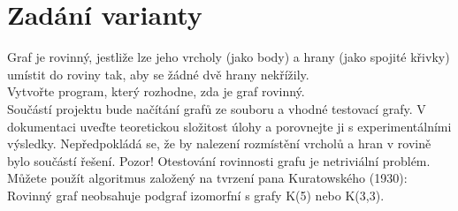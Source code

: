 \section{Zadání varianty}
Graf je rovinný, jestliže lze jeho vrcholy (jako body) a hrany (jako spojité křivky) umístit do roviny tak, aby se žádné dvě hrany nekřížily.\\


Vytvořte program, který rozhodne, zda je graf rovinný.\\
Součástí projektu bude načítání grafů ze souboru a vhodné testovací grafy. V dokumentaci uveďte teoretickou složitost úlohy a porovnejte ji s experimentálními výsledky. Nepředpokládá se, že by nalezení rozmístění vrcholů a hran v rovině bylo součástí řešení.
Pozor! Otestování rovinnosti grafu je netriviální problém. Můžete použít algoritmus založený na tvrzení pana Kuratowského (1930): Rovinný graf neobsahuje podgraf izomorfní s grafy K(5) nebo K(3,3).